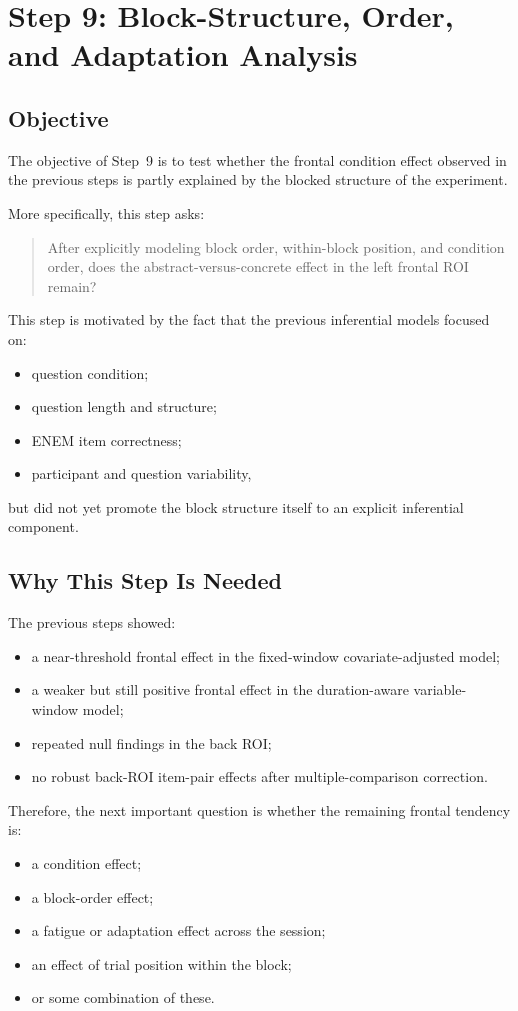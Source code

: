 \section{Step 9: Block-Structure, Order, and Adaptation Analysis}
\label{sec:step9_blocks}

\subsection{Objective}
The objective of Step~9 is to test whether the frontal condition effect observed in the previous
steps is partly explained by the blocked structure of the experiment.

More specifically, this step asks:
\begin{quote}
After explicitly modeling block order, within-block position, and condition order, does the
abstract-versus-concrete effect in the left frontal ROI remain?
\end{quote}

This step is motivated by the fact that the previous inferential models focused on:
\begin{itemize}
    \item question condition;
    \item question length and structure;
    \item ENEM item correctness;
    \item participant and question variability,
\end{itemize}
but did not yet promote the block structure itself to an explicit inferential component.

\subsection{Why This Step Is Needed}
The previous steps showed:
\begin{itemize}
    \item a near-threshold frontal effect in the fixed-window covariate-adjusted model;
    \item a weaker but still positive frontal effect in the duration-aware variable-window model;
    \item repeated null findings in the back ROI;
    \item no robust back-ROI item-pair effects after multiple-comparison correction.
\end{itemize}

Therefore, the next important question is whether the remaining frontal tendency is:
\begin{itemize}
    \item a condition effect;
    \item a block-order effect;
    \item a fatigue or adaptation effect across the session;
    \item an effect of trial position within the block;
    \item or some combination of these.
\end{itemize}


